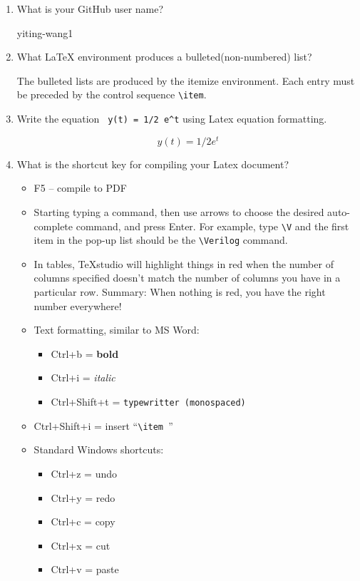 \documentclass[11pt]{article}
\newcommand{\Verilog}[2][]{%
	
}
\begin{document}
	\begin{enumerate}
		\item What is your GitHub user name?
		
			yiting-wang1
		
		\item What LaTeX environment produces a bulleted(non-numbered) list?
		
			The bulleted lists are produced by the itemize environment. Each entry must be preceded by the control sequence \verb|\item|.
		
		\item Write the equation \verb| y(t) = 1/2 e^t| using Latex equation formatting.
		
			  \[ y(t) = 1/2 e^t \] 
		
		\item What is the shortcut key for compiling your Latex document?
		
		\begin{itemize}
			\item F5 -- compile to PDF
			\item Starting typing a command, then use arrows to choose the desired auto-complete command, and press Enter.  For example, type \verb|\V| and the first item in the pop-up list should be the \verb|\Verilog| command.
			\item In tables, TeXstudio will highlight things in red when the number of columns specified doesn't match the number of columns you have in a particular row.  Summary: When nothing is red, you have the right number everywhere!
			\item Text formatting, similar to MS Word:
			\begin{itemize}
				\item Ctrl+b = \textbf{bold}
				\item Ctrl+i = \textit{italic}
				\item Ctrl+Shift+t = \texttt{typewritter (monospaced)}
			\end{itemize}
			\item Ctrl+Shift+i = insert ``\verb|\item |''
			\item Standard Windows shortcuts:
			\begin{itemize}
				\item Ctrl+z = undo
				\item Ctrl+y = redo
				\item Ctrl+c = copy
				\item Ctrl+x = cut
				\item Ctrl+v = paste
			\end{itemize}
		\end{itemize}

	\end{enumerate}
	
\end{document}
